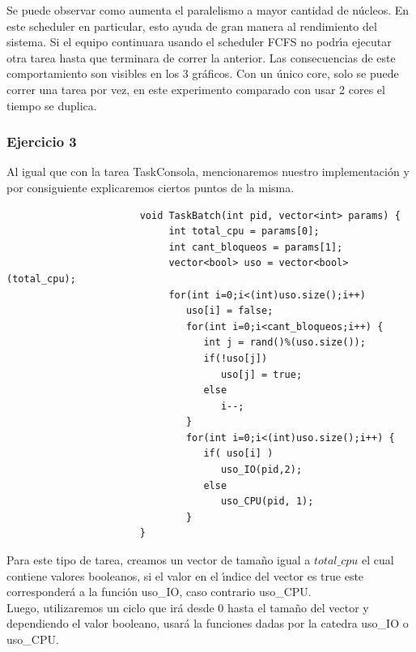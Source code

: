 \indent Se puede observar como aumenta el paralelismo a mayor cantidad de núcleos. 
En este scheduler en particular, esto ayuda de gran manera al rendimiento del sistema. Si el equipo
continuara usando el scheduler FCFS no podr\'{\i}a ejecutar otra tarea hasta que terminara de correr 
la anterior. Las consecuencias de este comportamiento son visibles en los 3 gr\'{a}ficos. Con un \'{u}nico core, 
solo se puede correr una tarea por vez, en este experimento comparado con usar 2 cores el tiempo se duplica.\\


\subsubsection[Resolución Ejercicio 3]{Ejercicio 3}


\indent Al igual que con la tarea TaskConsola, mencionaremos nuestro implementación y por consiguiente  
explicaremos ciertos puntos de la misma.\\
 \begin{verbatim}
                       void TaskBatch(int pid, vector<int> params) {
                            int total_cpu = params[0];
                            int cant_bloqueos = params[1];
                            vector<bool> uso = vector<bool>(total_cpu);
                            for(int i=0;i<(int)uso.size();i++) 
                               uso[i] = false;
                               for(int i=0;i<cant_bloqueos;i++) {
                                  int j = rand()%(uso.size());
                                  if(!uso[j])
                                     uso[j] = true;
                                  else
                                     i--; 
                               }
                               for(int i=0;i<(int)uso.size();i++) {
                                  if( uso[i] )
                                     uso_IO(pid,2); 
                                  else
                                     uso_CPU(pid, 1); 
                               }
                       }
 \end{verbatim}

 \indent Para este tipo de tarea, creamos un vector de tamaño igual a $total\_cpu$ el cual contiene valores booleanos, 
 si el valor en el \'{\i}ndice del vector es true este corresponder\'a a la funci\'{o}n uso\_IO, caso contrario uso\_CPU.\\
 Luego, utilizaremos un ciclo que irá desde 0 hasta el tamaño del vector y dependiendo el valor booleano, usará la funciones
 dadas por la catedra uso\_IO o uso\_CPU.\\
 
